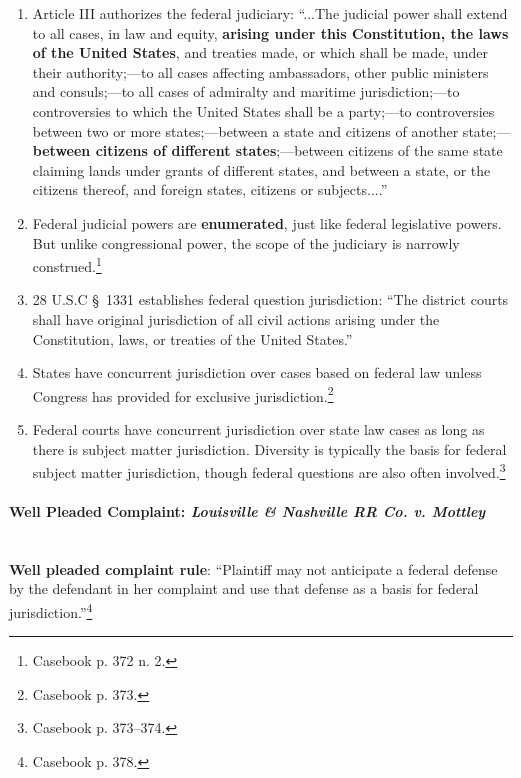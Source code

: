 \begin{enumerate}
    \item Article III authorizes the federal judiciary: ``...The judicial 
    power shall extend to all cases, in law and equity, \textbf{arising under 
    this Constitution, the laws of the United States}, and treaties made, or 
    which shall be made, under their authority;---to all cases affecting 
    ambassadors, other public ministers and consuls;---to all cases of 
    admiralty and maritime jurisdiction;---to controversies to which the 
    United States shall be a party;---to controversies between two or more 
    states;---between a state and citizens of another state;---\textbf{between 
    citizens of different states};---between citizens of the same state 
    claiming lands under grants of different states, and between a state, or 
    the citizens thereof, and foreign states, citizens or subjects....''
    \item Federal judicial powers are \textbf{enumerated}, just like federal 
    legislative powers. But unlike congressional power, the scope of the 
    judiciary is narrowly construed.\footnote{Casebook p. 372 n.  2.}
    \item 28 U.S.C \S\ 1331 establishes federal question jurisdiction: ``The 
    district courts shall have original jurisdiction of all civil actions 
    arising under the Constitution, laws, or treaties of the United States.''
    \item States have concurrent jurisdiction over cases based on federal law 
    unless Congress has provided for exclusive jurisdiction.\footnote{Casebook 
    p. 373.}
    \item Federal courts have concurrent jurisdiction over state law cases as 
    long as there is subject matter jurisdiction. Diversity is typically the 
    basis for federal subject matter jurisdiction, though federal questions 
    are also often involved.\footnote{Casebook p. 373--374.}
\end{enumerate}

\paragraph{Well Pleaded Complaint: \emph{Louisville \& Nashville RR Co. v.  
Mottley\\\\}}

\textbf{Well pleaded complaint rule}: ``Plaintiff may not anticipate a federal defense by the defendant in her complaint and use that defense as a basis for federal jurisdiction.''\footnote{Casebook p. 378.}

